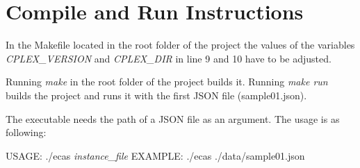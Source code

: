 \section{Compile and Run Instructions}

In the Makefile located in the root folder of the project the values of the variables \textit{CPLEX\_VERSION} and \textit{CPLEX\_DIR} in line 9 and 10 have to be adjusted. 

Running \textit{make} in the root folder of the project builds it. Running \textit{make run} builds the project and runs it with the first JSON file (sample01.json).

The executable needs the path of a JSON file as an argument. The usage is as following: 

USAGE:		./ecas \textit{instance\_file} \newline
EXAMPLE:	./ecas ./data/sample01.json


